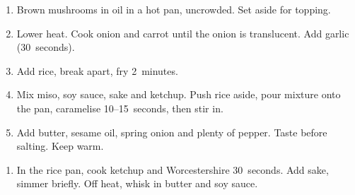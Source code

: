 \label{omurice-mushroom-miso}


\begin{ingredients}
\end{ingredients}

\begin{recipe}
  \begin{enumerate}

  \item Brown mushrooms in oil in a hot pan, uncrowded.  Set aside
    \fracQ{} for topping.

  \item Lower heat.  Cook onion and carrot until the onion is
    translucent.  Add garlic (30~seconds).

  \item Add rice, break apart, fry 2~minutes.

  \item Mix miso, soy sauce, sake and ketchup.  Push rice aside, pour
    mixture onto the pan, caramelise 10--15~seconds, then stir in.

  \item Add butter, sesame oil, spring onion and plenty of pepper.
    Taste before salting.  Keep warm.

  \end{enumerate}
\end{recipe}


\begin{ingredients}
\end{ingredients}

\begin{recipe}
  \begin{enumerate}

  \item In the rice pan, cook ketchup and Worcestershire 30~seconds.
    Add sake, simmer briefly.  Off heat, whisk in butter and soy sauce.

  \end{enumerate}
\end{recipe}

